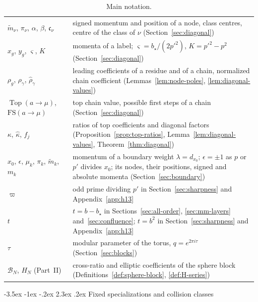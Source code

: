 \documentclass[twoside,10pt]{article}
\makeatletter
\numberwithin{equation}{section}
\theoremstyle{slbody}
\theoremstyle{definition}
\theoremstyle{remark}
\renewcommand{\section}{%
  \@startsection{section}{1}{\z@}%
    {-3.5ex \@plus -1ex \@minus -.2ex}%
    {2.3ex \@plus .2ex}%
    {\normalfont\large\bfseries}}
\makeatother
\begin{document}
\begin{table}[p]
\begin{tabular}{@{}p{}p{}@{}}
\(\tilde m_\nu\), \(\pi_\nu\), \(\alpha\), \(\beta\), \(\mathfrak c_\nu\) & signed momentum and position of a node, class centres, centre of the class of \(\nu\) (Section~\ref{sec:diagonal})\\
\(x_g\), \(y_g\), \(\varsigma\), \(K\) & momenta of a label; \(\varsigma=b_\star/(2p'^2)\), \(K=p'^2-p^2\) (Section~\ref{sec:diagonal})\\
\(\rho_g\), \(\rho_\gamma\), \(\hat\rho_\gamma\) & leading coefficients of a residue and of a chain, normalized chain coefficient (Lemmas~\ref{lem:node-poles}, \ref{lem:diagonal-values})\\
\(\operatorname{Top}(a\to\mu)\), \(\mathrm{FS}(a\to\mu)\) & top chain value, possible first steps of a chain (Section~\ref{sec:diagonal})\\
\(\kappa\), \(\hat\kappa\), \(f_j\) & ratios of top coefficients and diagonal factors (Proposition~\ref{prop:top-ratios}, Lemma~\ref{lem:diagonal-values}, Theorem~\ref{thm:diagonal})\\
\(x_0\), \(\epsilon\), \(\mu_k\), \(\pi_k\), \(\tilde m_k\), \(m_k\) & momentum of a boundary weight \(\lambda=d_{x_0}\); \(\epsilon=\pm1\) as \(p\) or \(p'\) divides \(x_0\); its nodes, their positions, signed and absolute momenta (Section~\ref{sec:boundary})\\
\(\varpi\) & odd prime dividing \(p'\) in Section~\ref{sec:sharpness} and Appendix~\ref{app:h13}\\
\(t\) & \(t=b-b_\star\) in Sections~\ref{sec:all-order}, \ref{sec:mm-layers} and~\ref{sec:confluence}; \(t=b^2\) in Section~\ref{sec:sharpness} and Appendix~\ref{app:h13}\\
\(\tau\) & modular parameter of the torus, \(q=e^{2\pi i\tau}\) (Section~\ref{sec:blocks})\\
\(\mathcal B_N\), \(H_N\) (Part~II) & cross-ratio and elliptic coefficients of the sphere block (Definitions~\ref{def:sphere-block}, \ref{def:H-series})\\
\hline
\end{tabular}
\caption{Main notation.}\label{tab:notation}
\end{table}

\section{Fixed specializations and collision classes}
\label{sec:resonance}
\end{document}
